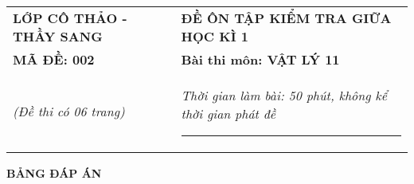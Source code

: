 \begin{center}
	\begin{tabular}{M{6.5cm}M{11cm}}
		\textbf{LỚP CÔ THẢO - THẦY SANG}& \textbf{ĐỀ ÔN TẬP KIỂM TRA GIỮA HỌC KÌ 1}\\
		\textbf{MÃ ĐỀ: 002}& \textbf{Bài thi môn: VẬT LÝ 11}\\
		\textit{(Đề thi có 06 trang)}& \textit{Thời gian làm bài: 50 phút, không kể thời gian phát đề}
		
		\noindent\rule{4cm}{0.8pt} \\
	\end{tabular}
\end{center}
\setcounter{section}{0}
\begin{center}
	\textbf{\large BẢNG ĐÁP ÁN}
\end{center}
\section{}
\section{}
\section{}
